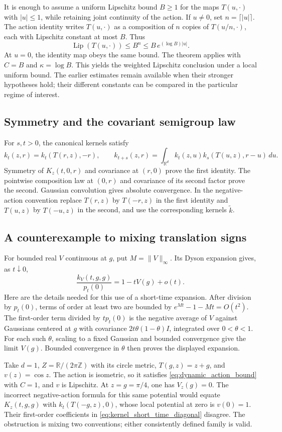 It is enough to assume a uniform Lipschitz bound $B\geq1$ for the
maps $T(u,\cdot)$ with $|u|\leq1$, while retaining joint continuity
of the action. If $u\ne0$, set $n=\lceil|u|\rceil$. The action
identity writes $T(u,\cdot)$ as a composition of $n$ copies of
$T(u/n,\cdot)$, each with Lipschitz constant at most $B$. Thus
\[
\operatorname{Lip}(T(u,\cdot))
\leq B^n\leq B\,e^{(\log B)|u|}.
\]
At $u=0$, the identity map obeys the same bound. The theorem applies
with $C=B$ and $\kappa=\log B$. This yields the weighted Lipschitz
conclusion under a local uniform bound. The earlier estimates remain
available when their stronger hypotheses hold; their different constants
can be compared in the particular regime of interest.

\subsection{Symmetry and the covariant semigroup law}
For $s,t>0$, the canonical kernels satisfy
\[
k_t(z,r)=k_t(T(r,z),-r),\qquad
k_{t+s}(z,r)=\int_{\mathbb R^d}
             k_t(z,u)k_s(T(u,z),r-u)\,du.
\]
Symmetry of $K_z(t,0,r)$ and covariance at $(r,0)$ prove the first
identity. The pointwise composition law at $(0,r)$ and covariance
of its second factor prove the second. Gaussian convolution gives
absolute convergence. In the negative-action convention replace
$T(r,z)$ by $T(-r,z)$ in the first identity and $T(u,z)$ by
$T(-u,z)$ in the second, and use the corresponding kernels $\widetilde k$.

\subsection{A counterexample to mixing translation signs}
For bounded real $V$ continuous at $g$, put $M=\|V\|_\infty$.
Its Dyson expansion gives, as $t\downarrow0$,
\[
\frac{k_V(t,g,g)}{p_t(0)}=1-tV(g)+o(t).
\tag{S}\label{eq:kernel_short_time_diagonal}
\]
Here are the details needed for this use of a short-time expansion.
After division by $p_t(0)$, terms of order at least two are bounded by
$e^{Mt}-1-Mt=O(t^2)$. The first-order term divided by $t p_t(0)$ is
the negative average of $V$ against Gaussians centered at $g$ with
covariance $2t\theta(1-\theta)I$, integrated over $0<\theta<1$.
For each such $\theta$, scaling to a fixed Gaussian and bounded
convergence give the limit $V(g)$. Bounded convergence in $\theta$
then proves the displayed expansion.

Take $d=1$, $Z=\mathbb R/(2\pi\mathbb Z)$ with its circle metric,
$T(g,z)=z+g$, and $v(z)=\cos z$. The action is isometric, so it
satisfies \eqref{eq:dynamic_action_bound} with $C=1$, and $v$ is
Lipschitz. At $z=g=\pi/4$, one has $V_z(g)=0$.
The incorrect negative-action formula for this same potential would
equate $K_z(t,g,g)$ with $k_t(T(-g,z),0)$, whose local potential
at zero is $v(0)=1$. Their first-order coefficients in
\eqref{eq:kernel_short_time_diagonal} disagree. The obstruction is
mixing two conventions; either consistently defined family is valid.
